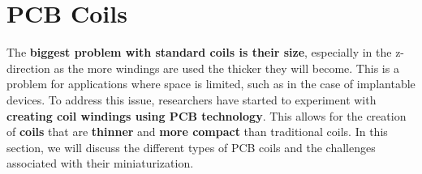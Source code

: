 \section{PCB Coils}
The \textbf{biggest problem with standard coils is their size}, especially in the z-direction as the more windings are used the thicker they will become. This is a problem for applications where space is limited, such as in the case of implantable devices. To address this issue, researchers have started to experiment with \textbf{creating coil windings using PCB technology}. This allows for the creation of \textbf{coils} that are \textbf{thinner} and \textbf{more compact} than traditional coils. In this section, we will discuss the different types of PCB coils and the challenges associated with their miniaturization.








